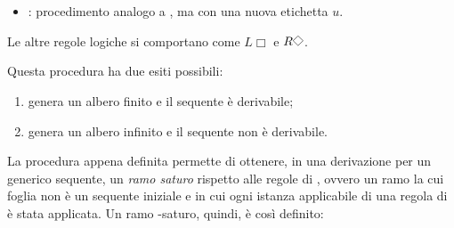 \documentclass[a4paper,12pt]{article}
\newcommand{\latinmodern}[1]{\text{#1}}
\newcommand{\latinmath}[1]{\text{\latinmodern{#1}}} %
\newcommand{\Dmd}{\mathord{\vcenter{\hbox{\tikz[baseline=-0.6ex]{\draw[line width=0.4pt, scale=1, rotate=45] (0,0) rectangle (0.2,0.2);}}}}} %
\begin{document}
\begin{defin}
\begin{description}
\begin{enumerate}
\begin{itemize}
				            \item \latinmath{Ser}: procedimento analogo a \latinmath{Rif}, ma con una nuova etichetta $u$.
			            \end{itemize}
			            Le altre regole logiche si comportano come $L\Box$ e $R\Dmd$.
		      \end{enumerate}
	\end{description}
	Questa procedura ha due esiti possibili:
	\begin{enumerate}
		\item genera un albero finito e il sequente è derivabile;
		\item genera un albero infinito e il sequente non è derivabile. \\
	\end{enumerate}
\end{defin}

La procedura appena definita permette di ottenere, in una derivazione per un generico sequente, un \emph{ramo saturo} rispetto alle regole di \latinmath{G3L}, ovvero un ramo la cui foglia non è un sequente iniziale e in cui ogni istanza applicabile di una regola di \latinmath{G3L} è stata applicata. Un ramo \latinmath{L}-saturo, quindi, è così definito: \\
\end{document}

